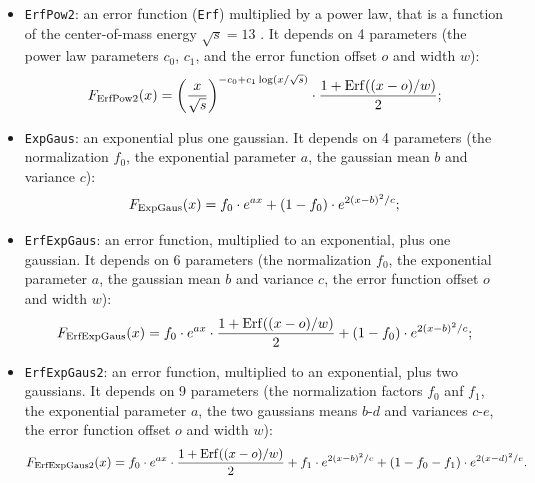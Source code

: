 \begin{itemize}
  \item {\tt ErfPow2}: an error function ({\tt Erf}) multiplied by a power law, that is a function of the center-of-mass energy $\sqrt{s}= 13$ \TeV. It depends on 4 parameters (the power law parameters $c_0$, $c_1$, and the error function offset $o$ and width $w$): $$F_{\rm ErfPow2}(x)={ \left( \frac{x}{\sqrt{s}} \right)}^{- c_0 + c_1 \log(x/\sqrt{s})} \cdot \frac{1 + {\rm Erf}((x-o)/w)}{2};$$
  \item {\tt ExpGaus}: an exponential plus one gaussian. It depends on 4 parameters (the normalization $f_0$, the exponential parameter $a$, the gaussian mean $b$ and variance $c$): $$F_{\rm ExpGaus}(x) = f_0 \cdot e^{ax} + (1-f_0) \cdot e^{2(x-b)^2/c};$$
  \item {\tt ErfExpGaus}: an error function, multiplied to an exponential, plus one gaussian. It depends on 6 parameters (the normalization $f_0$, the exponential parameter $a$, the gaussian mean $b$ and variance $c$, the error function offset $o$ and width $w$): $$F_{\rm ErfExpGaus}(x) = f_0 \cdot e^{ax} \cdot \frac{1 + {\rm Erf}((x-o)/w)}{2} + (1-f_0) \cdot e^{2(x-b)^2/c};$$
  \item {\tt ErfExpGaus2}: an error function, multiplied to an exponential, plus two gaussians. It depends on 9 parameters (the normalization factors $f_0$ anf $f_1$, the exponential parameter $a$, the two gaussians means $b$-$d$ and variances $c$-$e$, the error function offset $o$ and width $w$): $$F_{\rm ErfExpGaus2}(x) = f_0 \cdot e^{ax} \cdot \frac{1 + {\rm Erf}((x-o)/w)}{2} + f_1 \cdot e^{2(x-b)^2/c} + (1-f_0-f_1) \cdot e^{2(x-d)^2/e}.$$
\end{itemize}

